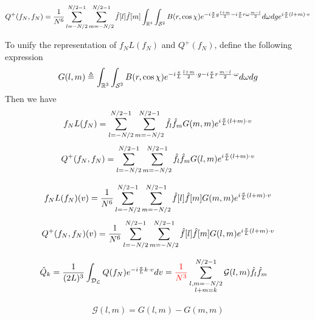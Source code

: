 \documentclass[11pt]{amsart}
\begin{document}
\color{blue}
\begin{align*}
\begin{split}
Q^{+}(f_N,f_N)&= \frac{1}{N^6}\sum_{l = -N/2}^{N/2-1} \sum_{m = -N/2}^{N/2-1} \hat f[l] \hat f[m]  \int_{\mathbb{R}^3} \int_{\mathcal{S}^2} {B}(r,\cos\chi) 
e^{-i{\pi \over L} g \frac{l+m}{2} -i {\pi \over L} r\omega \frac{m-l}{2}}
d\omega dg e^{i{\pi \over L}(l+m)\cdot v}\\
\end{split}
\end{align*}
\color{black}

To unify the representation of $f_NL(f_N)$ and $Q^{+}(f_N)$, define the following expression
\begin{equation*}
G(l,m) \triangleq \int_{\mathbb{R}^3} \int_{\mathcal{S}^2} {B}(r,\cos\chi) 
e^{-i{\pi \over L}\frac{l+m}{2} \cdot g -i {\pi \over L} r \frac{m-l}{2}\cdot \omega}d\omega dg 
\end{equation*}
Then we have
\begin{equation*}
f_NL(f_N) = \sum_{l = -N/2}^{N/2-1}\sum_{m = -N/2}^{N/2-1}\hat f_l \hat f_m G(m,m) e^{i{\pi \over L}(l+m)\cdot v}
\end{equation*}
\begin{equation*}
Q^{+}(f_N,f_N) =  \sum_{l = -N/2}^{N/2-1}\sum_{m = -N/2}^{N/2-1}\hat f_l \hat f_m G(l,m) e^{i{\pi \over L}(l+m)\cdot v}
\end{equation*}

\color{blue}
\begin{equation*}
f_NL(f_N)(v) = \frac{1}{N^6} \sum_{l = -N/2}^{N/2-1}\sum_{m = -N/2}^{N/2-1}\hat f[l] \hat f[m] G(m,m) e^{i{\pi \over L}(l+m)\cdot v}
\end{equation*}
\begin{equation*}
Q^{+}(f_N,f_N)(v) =  \frac{1}{N^6} \sum_{l = -N/2}^{N/2-1}\sum_{m = -N/2}^{N/2-1}\hat f[l] \hat f[m] G(l,m) e^{i{\pi \over L}(l+m)\cdot v}
\end{equation*}
\color{black}

\begin{align*}\begin{split}
\hat Q_k &=    \frac{1}{(2L)^3}\int_\mathcal{D_L} Q(f_N)e^{-i{\pi \over L}k\cdot v} dv =  \textcolor{red}{\frac{1}{N^3}}\sum_{\substack{l,m= -N/2 \\ l+m = k}}^{N/2-1}\mathcal{G}(l,m)\hat f_l  \hat f_m
\end{split}\end{align*}

\begin{align*}\begin{split}
\mathcal{G}(l,m) = G(l,m) - G(m,m)
\end{split}\end{align*}
\end{document}
